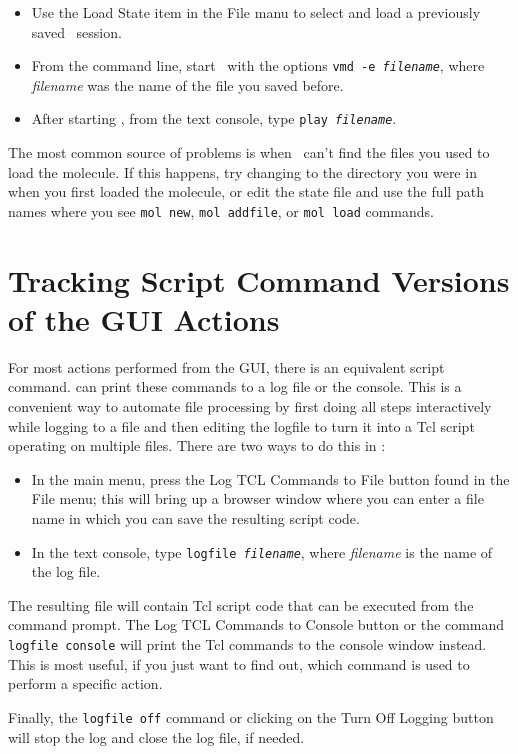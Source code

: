 \begin{itemize}

\item Use the {\sf Load State} item in the {\sf File} manu to select and
      load a previously saved \VMD\ session.

\item From the command line, start \VMD\ with the options 
{\tt vmd -e {\it filename}}, where {\it filename} was the name of the file you
saved before.  

\item After starting \VMD, from the text console, type {\tt play {\it filename}}. 

\end{itemize}

The most common source of problems is when \VMD\ can't find the files you
used to load the molecule.  If this happens, try changing to the directory
you were in when you first loaded the molecule, or edit the state file and
use the full path names where you see {\tt mol new}, 
{\tt mol addfile}, or {\tt mol load} commands.



\section{Tracking Script Command Versions of the GUI Actions}
\label{ug:scripts:logfile}

For most actions performed from the \VMD GUI, there is an equivalent
script command. \VMD can print these commands to a log file or the
console. This is a convenient way to automate file processing by first 
doing all steps interactively while logging to a file and then editing
the logfile to turn it into a Tcl script operating on multiple files.
There are two ways to do this in \VMD:
\begin{itemize}
\item In the main menu, press the {\sf Log TCL Commands to File} button 
found in the {\sf File} menu; this will bring up a browser window where you 
can enter a file name in which you can save the resulting script code.
\item In the text console, type {\tt logfile {\it filename}}, where
{\it filename} is the name of the log file.
\end{itemize}

The resulting file will contain Tcl script code that can be executed
from the \VMD command prompt. The {\sf Log TCL Commands to Console} button
or the command {\tt logfile console} will print the Tcl commands to
the console window instead. This is most useful, if you just want to
find out, which \VMD command is used to perform a specific action.

Finally, the {\tt logfile off} command or clicking on the 
{\sf Turn Off Logging} button will stop the log and close
the log file, if needed.

